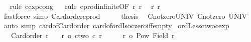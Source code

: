 \begin{isabellebody}
\ \ \isamarkupfalse%
{\isacharparenleft}{\kern0pt}rule\ cexp{\isacharunderscore}{\kern0pt}cong{}{\isacharparenright}{\kern0pt}\isanewline
\ \ \isamarkupfalse%
{\isacharparenleft}{\kern0pt}rule\ cprod{\isacharunderscore}{\kern0pt}infinite{}{\isacharprime}{\kern0pt}{\isacharbrackleft}{\kern0pt}OF\ r{}\ r{}{\isacharbrackright}{\kern0pt}{\isacharparenright}{\kern0pt}\ \isamarkupfalse%
\ r{}\ r{}\ \isamarkupfalse%
\ {\isacharparenleft}{\kern0pt}fastforce\ simp{\isacharcolon}{\kern0pt}\ Card{\isacharunderscore}{\kern0pt}order{\isacharunderscore}{\kern0pt}cprod{\isacharparenright}{\kern0pt}{\isacharplus}{\kern0pt}\isanewline
\ \ \isamarkupfalse%
\ \isamarkupfalse%
\ {\isacharquery}{\kern0pt}thesis\ \isacommand{{\isachardot}{\kern0pt}}\isamarkupfalse%
\isanewline
{}\isamarkupfalse%
%
\endisatagproof
{\isafoldproof}%
%
\isadelimproof
\isanewline
%
\endisadelimproof
\isanewline
{}\isamarkupfalse%
\ Cnotzero{\isacharunderscore}{\kern0pt}UNIV{\isacharcolon}{\kern0pt}\ {\isachardoublequoteopen}Cnotzero\ {\isacharbar}{\kern0pt}UNIV{\isacharbar}{\kern0pt}{\isachardoublequoteclose}\isanewline
%
\isadelimproof
%
\endisadelimproof
%
\isatagproof
{}\isamarkupfalse%
\ {\isacharparenleft}{\kern0pt}auto\ simp{\isacharcolon}{\kern0pt}\ card{\isacharunderscore}{\kern0pt}of{\isacharunderscore}{\kern0pt}Card{\isacharunderscore}{\kern0pt}order\ card{\isacharunderscore}{\kern0pt}of{\isacharunderscore}{\kern0pt}ordIso{\isacharunderscore}{\kern0pt}czero{\isacharunderscore}{\kern0pt}iff{\isacharunderscore}{\kern0pt}empty{\isacharparenright}{\kern0pt}%
\endisatagproof
{\isafoldproof}%
%
\isadelimproof
\isanewline
%
\endisadelimproof
\isanewline
{}\isamarkupfalse%
\ ordLess{\isacharunderscore}{\kern0pt}ctwo{\isacharunderscore}{\kern0pt}cexp{\isacharcolon}{\kern0pt}\isanewline
\ \ \ {\isachardoublequoteopen}Card{\isacharunderscore}{\kern0pt}order\ r{\isachardoublequoteclose}\isanewline
\ \ \ {\isachardoublequoteopen}r\ {\isacharless}{\kern0pt}o\ ctwo\ {\isacharcircum}{\kern0pt}c\ r{\isachardoublequoteclose}\isanewline
%
\isadelimproof
%
\endisadelimproof
%
\isatagproof
{}\isamarkupfalse%
\ {\isacharminus}{\kern0pt}\isanewline
\ \ \isamarkupfalse%
\ {\isachardoublequoteopen}r\ {\isacharless}{\kern0pt}o\ {\isacharbar}{\kern0pt}Pow\ {\isacharparenleft}{\kern0pt}Field\ r{\isacharparenright}{\kern0pt}{\isacharbar}{\kern0pt}{\isachardoublequoteclose}\ \isamarkupfalse%

\end{isabellebody}
